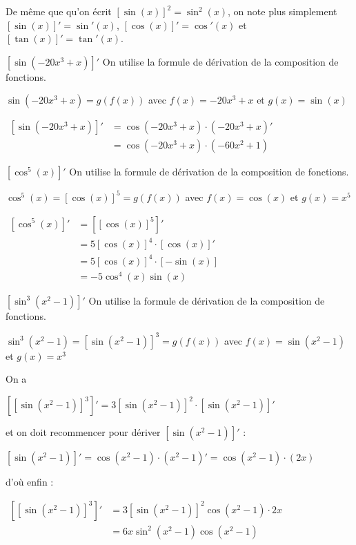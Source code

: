 \documentclass[a4paper,12pt]{article}
\begin{document}
\begin{notation}
	\tcblower
De même que qu'on écrit $[\sin(x)]^2 = \sin^2(x)$, on note plus simplement $[\sin(x)]' = \sin'(x)$, $[\cos(x)]' = \cos'(x)$ et $[\tan(x)]' = \tan'(x)$.
\end{notation}
\begin{exemple}
	$[\sin(-20x^3 + x)]'$
	\tcblower
On utilise la formule de dérivation de la composition de fonctions. 

$\sin(-20x^3 + x) = g(f(x))$ avec $f(x) = -20x^3 + x$ et $g(x) = \sin(x)$

$\begin{aligned}
	[\sin(-20x^3 + x)]' &= \cos(-20x^3 + x) \cdot (-20x^3 + x)'\\
			    &= \cos(-20x^3 + x) \cdot (-60x^2 + 1)
\end{aligned}$


\end{exemple}

\begin{exemple}
	$[\cos^5(x)]'$
	\tcblower
On utilise la formule de dérivation de la composition de fonctions. 

$\cos^5(x) = [\cos(x)]^5 = g(f(x))$ avec $f(x) = \cos(x)$ et $g(x) = x^5$

$\begin{aligned}
	[\cos^5(x)]' &=
[[\cos(x)]^5]'\\ 
		     &= 5[\cos(x)]^4 \cdot [\cos(x)]'\\
		     &= 5[\cos(x)]^4 \cdot [-\sin(x)]\\
		     &= -5\cos^4(x) \sin(x)
\end{aligned}$
\end{exemple}

\begin{exemple}
$[\sin^3(x^2 - 1)]'$
	\tcblower
On utilise la formule de dérivation de la composition de fonctions. 

$\sin^3(x^2 - 1) = [\sin(x^2 - 1)]^3 = g(f(x))$ avec $f(x) = \sin(x^2 - 1)$ et $g(x) = x^3$

On a 

$[[\sin(x^2 - 1)]^3]' = 3[\sin(x^2 - 1)]^2 \cdot [\sin(x^2 - 1)]'$

et on doit recommencer pour dériver $[\sin(x^2 - 1)]'$ :

$[\sin(x^2 - 1)]' = \cos(x^2 - 1) \cdot (x^2 - 1)' = \cos(x^2 - 1) \cdot (2x)$

d'où enfin : 

$\begin{aligned}
	[[\sin(x^2 - 1)]^3]' &= 3[\sin(x^2 - 1)]^2 \cos(x^2 - 1) \cdot 2x\\ &= 6x\sin^2(x^2 - 1)\cos(x^2 - 1)
\end{aligned}$
\end{exemple}
\end{document}
